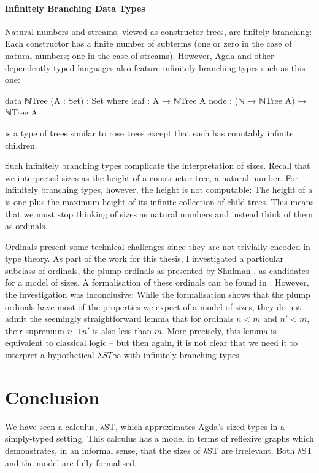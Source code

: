 \paragraph{Infinitely Branching Data Types}

Natural numbers and streams, viewed as constructor trees, are finitely
branching: Each constructor has a finite number of subterms (one or zero in the
case of natural numbers; one in the case of streams). However, Agda and other
dependently typed languages also feature infinitely branching types such as this
one:
\begin{code}
  data ℕTree (A : Set) : Set where
    leaf : A → ℕTree A
    node : (ℕ → ℕTree A) → ℕTree A
\end{code}
 is a type of trees similar to rose trees except that each
 has countably infinite children.

Such infinitely branching types complicate the interpretation of sizes. Recall
that we interpreted sizes as the height of a constructor tree, a natural number.
For infinitely branching types, however, the height is not computable: The
height of a  is one plus the maximum height of its infinite
collection of child trees. This means that we must stop thinking of sizes as
natural numbers and instead think of them as ordinals.

Ordinals present some technical challenges since they are not trivially encoded
in type theory. As part of the work for this thesis, I investigated a particular
subclass of ordinals, the plump ordinals \cite{taylor1996} as presented by
Shulman \cite{shulman2014}, as candidates for a model of sizes. A formalisation
of these ordinals can be found in . However,
the investigation was inconclusive: While the formalisation shows that the plump
ordinals have most of the properties we expect of a model of sizes, they do not
admit the seemingly straightforward lemma that for ordinals $n < m$ and $n′ <
m$, their supremum $n ⊔ n′$ is also less than $m$. More precisely, this lemma is
equivalent to classical logic -- but then again, it is not clear that we need it
to interpret a hypothetical $λST∞$ with infinitely branching types.


\section{Conclusion}
\label{sec:conclusion:conclusion}

We have seen a calculus, λST, which approximates Agda's sized types in a
simply-typed setting. This calculus has a model in terms of reflexive graphs
which demonstrates, in an informal sense, that the sizes of λST are irrelevant.
Both λST and the model are fully formalised.
